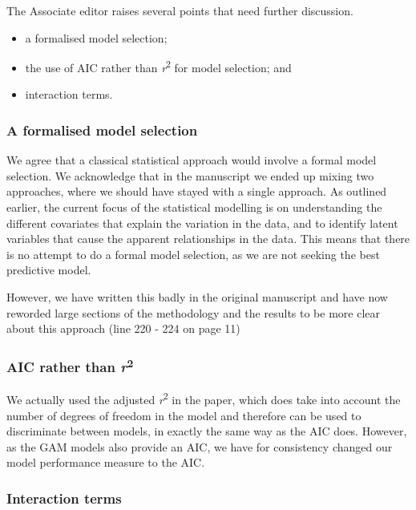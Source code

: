 \documentclass[]{elsarticle} %
\providecommand{\tightlist}{%
  \setlength{\itemsep}{0pt}\setlength{\parskip}{0pt}}
\begin{document}
The Associate editor raises several points that need further discussion.

\begin{itemize}
\tightlist
\item
  a formalised model selection;
\item
  the use of AIC rather than \emph{r}\textsuperscript{2} for model selection; and
\item
  interaction terms.
\end{itemize}

\hypertarget{a-formalised-model-selection}{%
\subsubsection{A formalised model selection}\label{a-formalised-model-selection}}

We agree that a classical statistical approach would involve a formal model selection. We acknowledge that in the manuscript we ended up mixing two approaches, where we should have stayed with a single approach. As outlined earlier, the current focus of the statistical modelling is on understanding the different covariates that explain the variation in the data, and to identify latent variables that cause the apparent relationships in the data. This means that there is no attempt to do a formal model selection, as we are not seeking the best predictive model.

However, we have written this badly in the original manuscript and have now reworded large sections of the methodology and the results to be more clear about this approach (line 220 - 224 on page 11)

\hypertarget{aic-rather-than-r2}{%
\subsubsection{\texorpdfstring{AIC rather than \emph{r}\textsuperscript{2}}{AIC rather than r2}}\label{aic-rather-than-r2}}

We actually used the adjusted \emph{r}\textsuperscript{2} in the paper, which does take into account the number of degrees of freedom in the model and therefore can be used to discriminate between models, in exactly the same way as the AIC does. However, as the GAM models also provide an AIC, we have for consistency changed our model performance measure to the AIC.

\hypertarget{interaction-terms}{%
\subsubsection{Interaction terms}\label{interaction-terms}}
\end{document}
